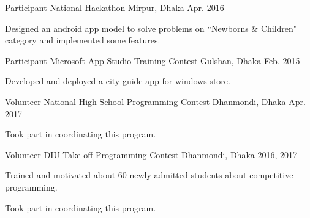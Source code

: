 

\begin{cventries}


  \cventry
    {Participant} %
    {National Hackathon} %
    {Mirpur, Dhaka} %
    {Apr. 2016} %
    {
      \begin{cvitems} %
        \item {Designed an android app model to solve problems on ``Newborns \& Children" category and implemented some features.}
      \end{cvitems}
    }

  \cventry
    {Participant} %
    {Microsoft App Studio Training Contest} %
    {Gulshan, Dhaka} %
    {Feb. 2015} %
    {
      \begin{cvitems} %
        \item {Developed and deployed a city guide app for windows store.}
      \end{cvitems}
    }

  \cventry
    {Volunteer} %
    {National High School Programming Contest} %
    {Dhanmondi, Dhaka} %
    {Apr. 2017} %
    {
      \begin{cvitems} %
        \item {Took part in coordinating this program.}
      \end{cvitems}
    }


  \cventry
    {Volunteer} %
    {DIU Take-off Programming Contest} %
    {Dhanmondi, Dhaka} %
    {2016, 2017} %
    {
      \begin{cvitems} %
        \item {Trained and motivated about 60 newly admitted students about competitive programming.}
        \item {Took part in coordinating this program.}
      \end{cvitems}
    }
    






\end{cventries}
